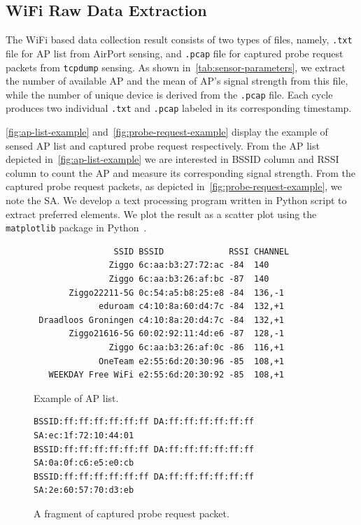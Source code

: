 \subsection{WiFi Raw Data Extraction} %
\label{sub:wifi_raw_data_extraction}
The WiFi based data collection result consists of two types of files, namely, \verb|.txt| file for \ac{AP} list from AirPort sensing, and \verb|.pcap| file for captured probe request packets from \verb|tcpdump| sensing. As shown in~\autoref{tab:sensor-parameters}, we extract the number of available \ac{AP} and the mean of \ac{AP}'s signal strength from this file, while the number of unique device is derived from the \verb|.pcap| file. Each cycle produces two individual \verb|.txt| and \verb|.pcap| labeled in its corresponding timestamp.

\autoref{fig:ap-list-example} and~\autoref{fig:probe-request-example} display the example of sensed \ac{AP} list and captured probe request respectively. From the \ac{AP} list depicted in~\autoref{fig:ap-list-example} we are interested in \ac{BSSID} column and \ac{RSSI} column to count the \ac{AP} and measure its corresponding signal strength. From the captured probe request packets, as depicted in~\autoref{fig:probe-request-example}, we note the \ac{SA}. We develop a text processing program written in Python script to extract preferred elements. We plot the result as a scatter plot using the \verb|matplotlib| package in Python~\cite{Hunter:2007}.

\begin{figure}[ht]
	\centering
\begin{verbatim}
                SSID BSSID             RSSI CHANNEL 
               Ziggo 6c:aa:b3:27:72:ac -84  140     
               Ziggo 6c:aa:b3:26:af:bc -87  140     
       Ziggo22211-5G 0c:54:a5:b8:25:e8 -84  136,-1  
             eduroam c4:10:8a:60:d4:7c -84  132,+1  
 Draadloos Groningen c4:10:8a:20:d4:7c -84  132,+1  
       Ziggo21616-5G 60:02:92:11:4d:e6 -87  128,-1  
               Ziggo 6c:aa:b3:26:af:0c -86  116,+1  
             OneTeam e2:55:6d:20:30:96 -85  108,+1  
   WEEKDAY Free WiFi e2:55:6d:20:30:92 -85  108,+1  
\end{verbatim}
	\caption{Example of \ac{AP} list.}
	\label{fig:ap-list-example}
\end{figure}

\begin{figure}[ht]
\centering
\begin{verbatim}
BSSID:ff:ff:ff:ff:ff:ff DA:ff:ff:ff:ff:ff:ff SA:ec:1f:72:10:44:01
BSSID:ff:ff:ff:ff:ff:ff DA:ff:ff:ff:ff:ff:ff SA:0a:0f:c6:e5:e0:cb
BSSID:ff:ff:ff:ff:ff:ff DA:ff:ff:ff:ff:ff:ff SA:2e:60:57:70:d3:eb
\end{verbatim}
\caption{A fragment of captured probe request packet.}
\label{fig:probe-request-example}
\end{figure}

